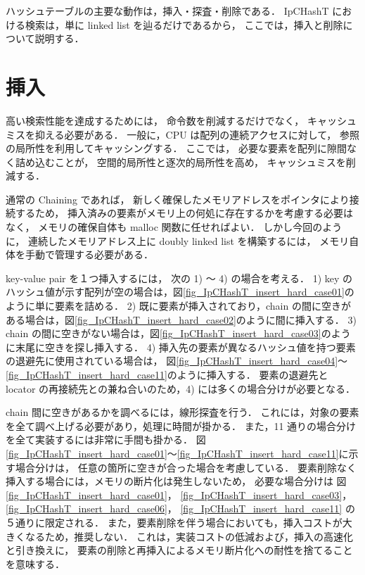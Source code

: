 ハッシュテーブルの主要な動作は，挿入・探査・削除である．
IpCHashT における検索は，単に linked list を辿るだけであるから，
ここでは，挿入と削除について説明する．

\section{挿入}

高い検索性能を達成するためには，
命令数を削減するだけでなく，
キャッシュミスを抑える必要がある．
一般に，CPU は配列の連続アクセスに対して，
参照の局所性を利用してキャッシングする．
ここでは，
必要な要素を配列に隙間なく詰め込むことが，
空間的局所性と逐次的局所性を高め，
キャッシュミスを削減する．

通常の Chaining であれば，
新しく確保したメモリアドレスをポインタにより接続するため，
挿入済みの要素がメモリ上の何処に存在するかを考慮する必要はなく，
メモリの確保自体も malloc 関数に任せればよい．
しかし今回のように，
連続したメモリアドレス上に doubly linked list を構築するには，
メモリ自体を手動で管理する必要がある．

key-value pair を１つ挿入するには，
次の 1) 〜 4) の場合を考える．
1) key のハッシュ値が示す配列が空の場合は，図\ref{fig_IpCHashT_insert_hard_case01}のように単に要素を詰める．
2) 既に要素が挿入されており，chain の間に空きがある場合は，図\ref{fig_IpCHashT_insert_hard_case02}のように間に挿入する．
3) chain の間に空きがない場合は，図\ref{fig_IpCHashT_insert_hard_case03}のように末尾に空きを探し挿入する．
4) 挿入先の要素が異なるハッシュ値を持つ要素の退避先に使用されている場合は，
図\ref{fig_IpCHashT_insert_hard_case04}〜\ref{fig_IpCHashT_insert_hard_case11}のように挿入する．
要素の退避先と locator の再接続先との兼ね合いのため，4) には多くの場合分けが必要となる．

chain 間に空きがあるかを調べるには，線形探査を行う．
これには，対象の要素を全て調べ上げる必要があり，処理に時間が掛かる．
また，11 通りの場合分けを全て実装するには非常に手間も掛かる．
図\ref{fig_IpCHashT_insert_hard_case01}〜\ref{fig_IpCHashT_insert_hard_case11}に示す場合分けは，
任意の箇所に空きが合った場合を考慮している．
要素削除なく挿入する場合には，メモリの断片化は発生しないため，
必要な場合分けは
図\ref{fig_IpCHashT_insert_hard_case01}，
\ref{fig_IpCHashT_insert_hard_case03}，
\ref{fig_IpCHashT_insert_hard_case06}，
\ref{fig_IpCHashT_insert_hard_case11}
の５通りに限定される．
また，要素削除を伴う場合においても，挿入コストが大きくなるため，推奨しない．
これは，実装コストの低減および，挿入の高速化と引き換えに，
要素の削除と再挿入によるメモリ断片化への耐性を捨てることを意味する．

